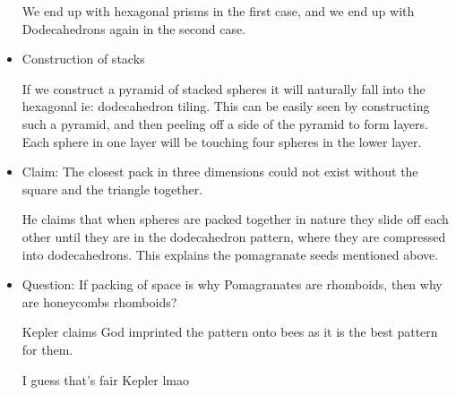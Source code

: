 \documentclass{report}
\begin{document}
\begin{itemize}
\begin{mdframed}
            We end up with hexagonal prisms in the first
            case, and we end up with Dodecahedrons again
            in the second case.
        \end{mdframed}
    \item Construction of stacks
        \begin{mdframed}
            If we construct a pyramid of stacked spheres
            it will naturally fall into the hexagonal
            ie: dodecahedron tiling. This can be easily
            seen by constructing such a pyramid, and then
            peeling off a side of the pyramid to form layers.
            Each sphere in one layer will be touching four spheres
            in the lower layer.
        \end{mdframed}
    \item Claim: The closest pack in three dimensions could
        not exist without the square and the triangle together.
        \begin{mdframed}
            He claims that when spheres are packed together
            in nature they slide off each other until they are
            in the dodecahedron pattern, where they are
            compressed into dodecahedrons. This explains the
            pomagranate seeds mentioned above.
        \end{mdframed}
    \item Question: If packing of space is why Pomagranates are
        rhomboids, then why are honeycombs rhomboids?
        \begin{mdframed}
            Kepler claims God imprinted the pattern onto bees
            as it is the best pattern for them.

            \begin{mdframed}
                I guess that's fair Kepler lmao
            \end{mdframed}
        \end{mdframed}
\end{itemize}
\end{document}

